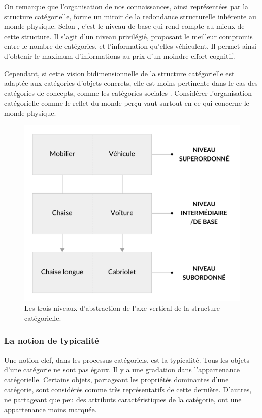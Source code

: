 {On remarque que l'organisation de nos connaissances, ainsi représentées par la structure catégorielle, forme un miroir de la redondance structurelle inhérente au monde physique. Selon \citep[p. 28]{rosch1978cognition}, c'est le niveau de base qui rend compte au mieux de cette structure. Il s'agit d'un niveau privilégié, proposant le meilleur compromis entre le nombre de catégories, et l'information qu'elles véhiculent. Il permet ainsi d'obtenir le maximum d'informations au prix d'un moindre effort cognitif.

Cependant, si cette vision bidimensionnelle de la structure catégorielle est adaptée aux catégories d'objets concrets, elle est moins pertinente dans le cas des catégories de concepts, comme les catégories sociales \citep[p. 72-88]{dubois1991semantique}. Considérer l'organisation catégorielle comme le reflet du monde perçu vaut surtout en ce qui concerne le monde physique.

\begin{figure}[t]
        \myfloatalign
        \includegraphics[width=.6\linewidth]{gfx/ch_3/categorieLVL}
        \caption{Les trois niveaux d'abstraction de l'axe vertical de la structure catégorielle.}\label{fig:categorieLVL}
\end{figure}

\subsubsection{La notion de typicalité}
\label{sec:ch3_typicité}

Une notion clef, dans les processus catégoriels, est la typicalité. Tous les objets d'une catégorie ne sont pas égaux. Il y a une gradation dans l'appartenance catégorielle. Certains objets, partageant les propriétés dominantes d'une catégorie, sont considérés comme très représentatifs de cette dernière. D'autres, ne partageant que peu des attributs caractéristiques de la catégorie, ont une appartenance moins marquée.

}

